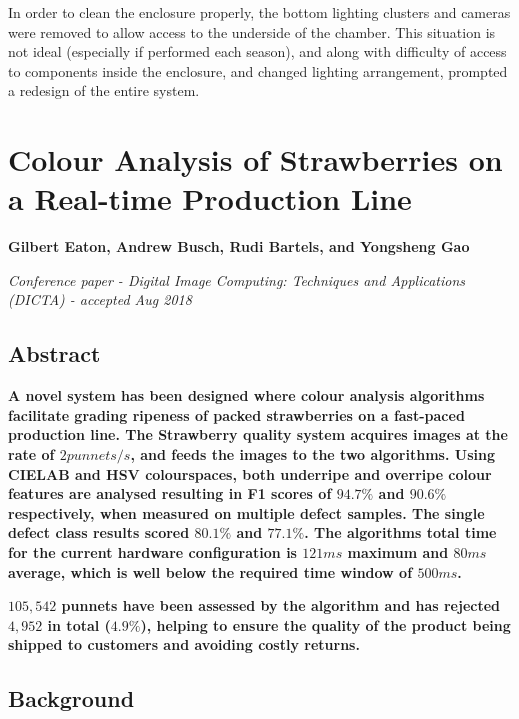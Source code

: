 \documentclass[fleqn,twoside]{article}
\begin{document}
In order to clean the enclosure properly, the bottom lighting clusters and cameras were removed to allow access to the underside of the chamber. This situation is not ideal (especially if performed each season), and along with difficulty of access to components inside the enclosure, and changed lighting arrangement, prompted a redesign of the entire system. 






\newpage
\section{Colour Analysis of Strawberries on a Real-time Production Line}
\label{sec:paper_2}

\textbf{Gilbert Eaton, Andrew Busch, Rudi Bartels, and Yongsheng Gao}

\textit{Conference paper - Digital Image Computing: Techniques and Applications (DICTA) - accepted Aug 2018}


\subsection{Abstract}

\textbf{A novel system has been designed where colour analysis algorithms facilitate grading ripeness of packed strawberries on a fast-paced production line. The Strawberry quality system acquires images at the rate of $2 punnets/s$, and feeds the images to the two algorithms. Using CIELAB and HSV colourspaces, both underripe and overripe colour features are analysed  resulting in F1 scores of $94.7\%$ and $90.6\%$ respectively, when measured on multiple defect samples. The single defect class results scored $80.1\%$ and $77.1\%$. The algorithms total time for the current hardware configuration is $121ms$ maximum and $80ms$ average, which is well below the required time window of $500ms$.}
	
\textbf{$105,542$ punnets have been assessed by the algorithm and has rejected $4,952$ in total ($4.9\%$),  helping to ensure the quality of the product being shipped to customers and avoiding costly returns.}


\subsection{Background}
\end{document}
